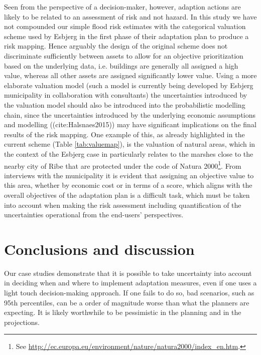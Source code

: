 \documentclass[draft,linenumbers]{agujournal}
\begin{document}
Seen from the perspective of a decision-maker, however, adaption actions are likely to be related to an assessment of risk and not hazard. In this study we have not compounded our simple flood risk estimates with the categorical valuation scheme used by Esbjerg in the first phase of their adaptation plan to produce a risk mapping. Hence arguably the design of the original scheme does not discriminate sufficiently between assets to allow for an objective prioritization based on the underlying data, i.e. buildings are generally all assigned a high value, whereas all other assets are assigned significantly lower value. Using a more elaborate valuation model (such a model is currently being developed by Esbjerg municipality in collaboration with consultants) the uncertainties introduced by the valuation model should also be introduced into the probabilistic modelling chain, since the uncertainties introduced by the underlying economic assumptions and modelling ({\color{blue}(cite:Halsnaes2015)}) may have significant implications on the final results of the risk mapping. One example of this, as already highlighted in the current scheme (Table \ref{tab:valuemap}), is the valuation of natural areas, which in the context of the Esbjerg case in particularly relates to the marshes close to the nearby city of Ribe that are protected under the code of Natura 2000\footnote{See \url{http://ec.europa.eu/environment/nature/natura2000/index_en.htm}.}. From interviews with the municipality it is evident that assigning an objective value to this area, whether by economic cost or in terms of a score, which aligns with the overall objectives of the adaptation plan is a difficult task, which must be taken into account when making the risk assessment including quantification of the uncertainties operational from the end-users' perspectives. 


\section{Conclusions and discussion}
\label{disc}
Our case studies demonstrate that it is possible to take uncertainty into account in deciding when and where to implement adaptation measures, even if one uses a light touch decision-making approach. If one fails to do so, bad scenarios, such as 95th percentiles, can be a order of magnitude worse than what the planners are expecting. It is likely worthwhile to be pessimistic in the planning and in the projections. 
\end{document}
